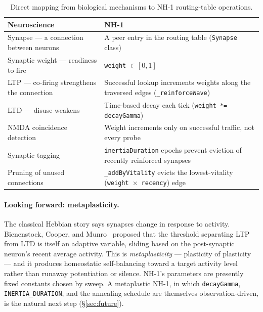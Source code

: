 \documentclass[conference]{IEEEtran}
\newcommand{\nhone}{NH-1\xspace}
\begin{document}
\begin{table}[t]
\centering
\caption{Direct mapping from biological mechanisms to \nhone routing-table operations.}
\label{tab:mapping}
\small
\begin{tabular}{@{}p{}p{}@{}}
\toprule
\textbf{Neuroscience} & \textbf{\nhone} \\
\midrule
Synapse --- a connection between neurons & A peer entry in the routing table (\texttt{Synapse} class) \\
Synaptic weight --- readiness to fire & \texttt{weight} $\in [0,1]$ \\
LTP --- co-firing strengthens the connection & Successful lookup increments weights along the traversed edges (\texttt{\_reinforceWave}) \\
LTD --- disuse weakens & Time-based decay each tick (\texttt{weight *= decayGamma}) \\
NMDA coincidence detection & Weight increments only on successful traffic, not every probe \\
Synaptic tagging~\cite{frey1997synaptic} & \texttt{inertiaDuration} epochs prevent eviction of recently reinforced synapses \\
Pruning of unused connections & \texttt{\_addByVitality} evicts the lowest-vitality (\texttt{weight}~$\times$~\texttt{recency}) edge \\
\bottomrule
\end{tabular}
\end{table}

\paragraph{Looking forward: metaplasticity.}
The classical Hebbian story says synapses change in response to
activity. Bienenstock, Cooper, and Munro~\cite{bcm1982theory} proposed
that the threshold separating LTP from LTD is itself an adaptive
variable, sliding based on the post-synaptic neuron's recent average
activity. This is \emph{metaplasticity} --- plasticity of plasticity ---
and it produces homeostatic self-balancing toward a target activity
level rather than runaway potentiation or silence. \nhone's parameters
are presently fixed constants chosen by sweep. A metaplastic \nhone,
in which \texttt{decayGamma}, \texttt{INERTIA\_DURATION}, and the
annealing schedule are themselves observation-driven, is the natural
next step (\S\ref{sec:future}).

\end{document}
